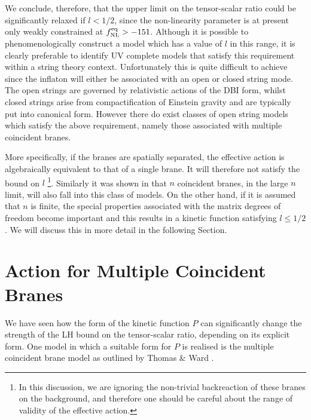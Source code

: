 We conclude, therefore, that 
the upper limit on the tensor-scalar ratio could be significantly 
relaxed if $l <1/2$, since the non-linearity parameter is at present only 
weakly constrained at $f_{\mathrm{NL}}^{\mathrm{eq}} >-151$. Although it is possible 
to phenomenologically construct a model which has a value of $l$ in this 
range, it is clearly preferable to identify  UV complete models
that satisfy this requirement within a string theory context. 
Unfortunately this is quite difficult to achieve since the inflaton 
will either be associated with an open or closed string mode. 
The open strings are governed by relativistic actions of the 
DBI form, whilst closed strings arise from compactification of Einstein gravity
and are typically put into canonical form.
However there do exist classes of open string
models which satisfy the above requirement, 
namely those associated with multiple coincident branes.


More specifically, if the branes are
spatially separated, the effective action is algebraically equivalent 
to that of a single brane. It will therefore not satisfy the 
bound on $l$ \footnote{In this discussion, we are ignoring 
the non-trivial backreaction of these branes on the background, and therefore 
one should be careful about the range of validity of the effective action.}. 
Similarly it was shown in \cite{thomasward}
that $n$ coincident branes, in the large $n$ limit, will also fall into 
this class of models. On the other hand, if it is assumed that 
$n$ is finite, the special properties associated with the 
matrix degrees of freedom become important and this 
results in a kinetic function satisfying $l \le 1/2$.
We will discuss this in more detail in the following Section.


% 
% 
% 
\section{Action for Multiple Coincident Branes} 
\label{sec:multibranes-multi}


We have seen how the form of the kinetic function
$P$ can significantly change the
strength of the LH bound on the tensor-scalar ratio, depending on its explicit
form. One model in which a suitable form for 
$P$ is realised is the multiple coincident
brane model as outlined by Thomas \& Ward \cite{thomasward}.


